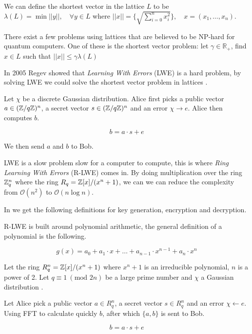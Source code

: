 We can define the shortest vector in the lattice $L$ to be
$\lambda(L) = \min || y ||, \quad \forall y \in L$ where
$||x|| = \{\sqrt{\sum_{i=0}^n x^2_i}\}, \quad x = (x_1, \ldots, x_n)$.

There exist a few problems using lattices that are believed to be NP-hard for
quantum computers. One of these is the shortest vector problem: let $\gamma \in
\mathbb{R}_+$, find $x \in L$
such that $||x|| \leq \gamma \lambda(L)$

In 2005 Regev showed that \textit{Learning With Errors} (LWE) is a hard
problem, by solving LWE we could solve the shortest vector problem in lattices
\citep{Regev05}.


\begin{definition}
    Let $\chi$ be a discrete Gaussian
    distribution. Alice first picks a public vector $a \in (\mathbb{Z} / q\mathbb{Z})^n$, a
    secret vector $s \in (\mathbb{Z} / q\mathbb{Z})^n$ and an error $\chi \rightarrow e$.
    Alice then computes $b$.

    \[ b = a \cdot s + e \]

    We then send $a$ and $b$ to Bob.
\end{definition}

LWE is a slow problem  slow for a computer to compute, this is where
\textit{Ring Learning With Errors} (R-LWE) comes in. By doing multiplication
over the ring $\mathbb{Z}^n_q$ where the ring $R_q = \mathbb{Z}[x] / (x^n + 1)$, we can we can
reduce the complexity from $\mathcal{O}(n^2)$ to $\mathcal{O}(n\log n)$.

In \citep{FPGA_Post_Quantum_Primitives} we get the following definitions for key
generation, encryption and decryption.

\begin{definition}
    R-LWE is built around polynomial arithmetic, the general definition of a
    polynomial is the following.

    \[ g(x) = a_0 + a_1 \cdot x + \ldots + a_{n-1} \cdot x^{n-1} + a_n \cdot x^n \]

    Let the ring $R_q^n = \mathbb{Z}[x]/(x^n + 1)$ where $x^n + 1$ is an irreducible
    polynomial, $n$ is a power of 2. Let $q \equiv 1\ (\text{mod } 2n)$ be a
    large prime number and $\chi$ a Gaussian distribution
    \citep{FPGA_Post_Quantum_Primitives}.

    Let Alice pick a public vector $a \in R_q^n$, a secret vector $s \in R_q^n$
    and an error $\chi \leftarrow e$. Using FFT to calculate quickly $b$, after
    which $\{a,b\}$ is sent to Bob.

    \[b = a \cdot s + e \]

\end{definition}

